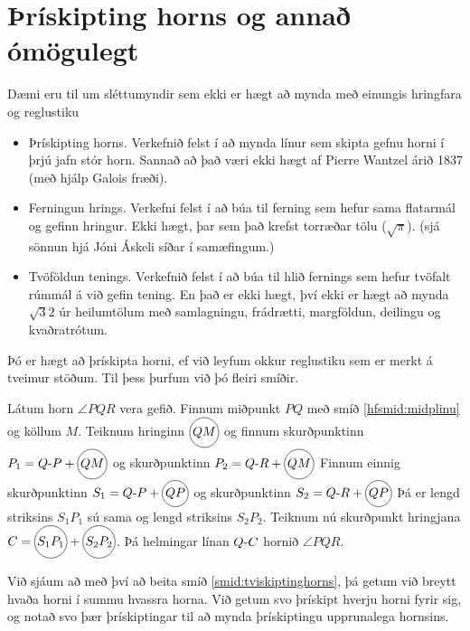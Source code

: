 \section{Þrískipting horns og annað ómögulegt} 
\begin{frame}
  Dæmi eru til um sléttumyndir sem ekki er hægt að mynda með einungis hringfara og reglustiku
\begin{itemize}
\item Þrískipting horns.
  Verkefnið felst í að mynda línur sem skipta gefnu horni í þrjú jafn stór horn.
  Sannað að það væri ekki hægt af Pierre Wantzel árið 1837 (með hjálp Galois fræði).
\item Ferningun hrings. Verkefni felst í að búa til ferning sem hefur sama flatarmál og 
gefinn hringur. Ekki hægt, þar sem það krefst torræðar tölu (\(\sqrt{\pi}\)). (sjá sönnun hjá Jóni Áskeli síðar í samæfingum.)
\item Tvöföldun tenings. Verkefnið felst í að búa til hlið fernings sem hefur tvöfalt rúmmál á við gefin tening.
  En það er ekki hægt, því ekki er hægt að mynda \(\sqrt{3}{2}\) úr heilumtölum með
samlagningu, frádrætti, margföldun, deilingu og kvaðratrótum.
\end{itemize}
\end{frame}

\begin{frame}
  Þó er hægt að þrískipta horni, ef við leyfum okkur reglustiku sem er merkt
  á tveimur stöðum. Til þess þurfum við þó fleiri smíðir.
\end{frame}

\begin{frame}
  \begin{smid}
    \label{smid:tviskiptinghorns}
    Látum horn \(\angle PQR\) vera gefið.
    Finnum miðpunkt \(PQ\) með smíð \ref{hfsmid:midplinu}
    og köllum \(M\).
    Teiknum hringinn \(\hri{QM}\) og finnum skurðpunktinn
    \(P_1 = \lin{Q}{P}+\hri{QM}\)  og skurðpunktinn \(P_2 = \lin{Q}{R}+\hri{QM}\)
    Finnum einnig  skurðpunktinn
    \(S_1 = \lin{Q}{P}+\hri{QP}\)  og skurðpunktinn \(S_2 = \lin{Q}{R}+\hri{QP}\)
    Þá er lengd striksins \(S_1P_1\) sú sama og lengd striksins
    \(S_2P_2\).
    Teiknum nú skurðpunkt hringjana
    \(C = \hri{S_1P_1}+\hri{S_2P_2}\).
    Þá helmingar línan \(\lin{Q}{C}\) hornið \(\angle PQR\).
  \end{smid}
\end{frame}

\begin{frame}
  Við sjáum að með því að beita smíð \ref{smid:tviskiptinghorns}, þá getum við
  breytt hvaða horni í summu hvassra horna. Við getum svo þrískipt hverju horni fyrir
  sig, og notað svo þær þrískiptingar til að mynda þrískiptingu upprunalega hornsins.
\end{frame}


